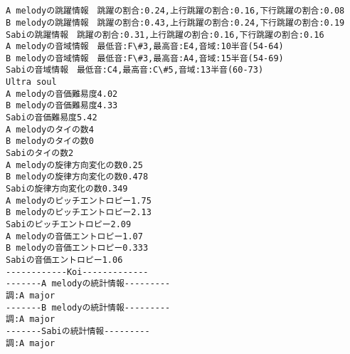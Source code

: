 \documentclass[11pt]{article}
\begin{document}
    \begin{center}
    \end{center}
    { \hspace*{\fill} \\}
    
    \begin{center}
    \end{center}
    { \hspace*{\fill} \\}
    
    \begin{Verbatim}[commandchars=\\\{\}]
A melodyの跳躍情報　跳躍の割合:0.24,上行跳躍の割合:0.16,下行跳躍の割合:0.08
B melodyの跳躍情報　跳躍の割合:0.43,上行跳躍の割合:0.24,下行跳躍の割合:0.19
Sabiの跳躍情報　跳躍の割合:0.31,上行跳躍の割合:0.16,下行跳躍の割合:0.16
A melodyの音域情報　最低音:F\#3,最高音:E4,音域:10半音(54-64)
B melodyの音域情報　最低音:F\#3,最高音:A4,音域:15半音(54-69)
Sabiの音域情報　最低音:C4,最高音:C\#5,音域:13半音(60-73)
Ultra soul
A melodyの音価難易度4.02
B melodyの音価難易度4.33
Sabiの音価難易度5.42
A melodyのタイの数4
B melodyのタイの数0
Sabiのタイの数2
A melodyの旋律方向変化の数0.25
B melodyの旋律方向変化の数0.478
Sabiの旋律方向変化の数0.349
A melodyのピッチエントロピー1.75
B melodyのピッチエントロピー2.13
Sabiのピッチエントロピー2.09
A melodyの音価エントロピー1.07
B melodyの音価エントロピー0.333
Sabiの音価エントロピー1.06
------------Koi-------------
-------A melodyの統計情報---------
調:A major
-------B melodyの統計情報---------
調:A major
-------Sabiの統計情報---------
調:A major

    \end{Verbatim}

    \begin{center}
    \end{center}
    { \hspace*{\fill} \\}
    
    \begin{center}
    \end{center}
    { \hspace*{\fill} \\}
    
\end{document}
